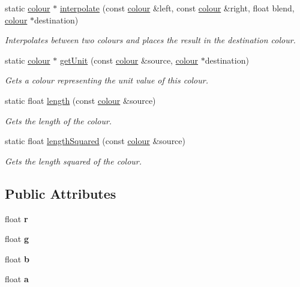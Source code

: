 \begin{DoxyCompactItemize}
static \hyperlink{classflounder_1_1colour}{colour} $\ast$ \hyperlink{classflounder_1_1colour_a28e6e41406cd96df4d956a2c963fd767}{interpolate} (const \hyperlink{classflounder_1_1colour}{colour} \&left, const \hyperlink{classflounder_1_1colour}{colour} \&right, float blend, \hyperlink{classflounder_1_1colour}{colour} $\ast$destination)
\begin{DoxyCompactList}\small\item\em Interpolates between two colours and places the result in the destination colour. \end{DoxyCompactList}\item 
static \hyperlink{classflounder_1_1colour}{colour} $\ast$ \hyperlink{classflounder_1_1colour_a3f9e4ec638e7e240d86704d821d0c3bc}{get\+Unit} (const \hyperlink{classflounder_1_1colour}{colour} \&source, \hyperlink{classflounder_1_1colour}{colour} $\ast$destination)
\begin{DoxyCompactList}\small\item\em Gets a colour representing the unit value of this colour. \end{DoxyCompactList}\item 
static float \hyperlink{classflounder_1_1colour_adb8aba4ecd184a4fbdf04261db788096}{length} (const \hyperlink{classflounder_1_1colour}{colour} \&source)
\begin{DoxyCompactList}\small\item\em Gets the length of the colour. \end{DoxyCompactList}\item 
static float \hyperlink{classflounder_1_1colour_a9eae1aa8bda5bec5c914edfc4f077057}{length\+Squared} (const \hyperlink{classflounder_1_1colour}{colour} \&source)
\begin{DoxyCompactList}\small\item\em Gets the length squared of the colour. \end{DoxyCompactList}\end{DoxyCompactItemize}
\subsection*{Public Attributes}
\begin{DoxyCompactItemize}
\item 
\mbox{\label{classflounder_1_1colour_ab143424eb7da34ce697c17b99be6079a}} 
float {\bfseries r}
\item 
\mbox{\label{classflounder_1_1colour_a15f34b3519639333763844da1fd58199}} 
float {\bfseries g}
\item 
\mbox{\label{classflounder_1_1colour_a8a4f0ed5abf283a4d1fd7c4e00dc9c4d}} 
float {\bfseries b}
\item 
\mbox{\label{classflounder_1_1colour_ab51885f0cf9043ad626cd7e4abd04b07}} 
float {\bfseries a}
\end{DoxyCompactItemize}


